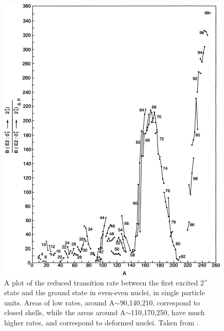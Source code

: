 \begin{figure}
    \centering
    \includegraphics[scale=2]{Introduction_Figs/ReducedTransbyMassCasten.png}
    \caption{A plot of the reduced transition rate between the first excited $2^+$ state and the ground state in even-even nuclei, in single particle units. Areas of low rates, around A$\sim$90,140,210, correspond to closed shells, while the areas around A$\sim$110,170,250, have much higher rates, and correspond to deformed nuclei. Taken from \citep{casten90:_structure}.}
    \label{fig:reducedtrans}
\end{figure}